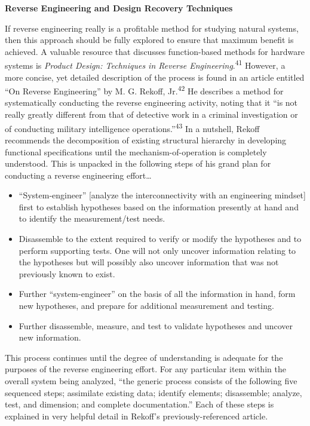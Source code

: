 \bigskip

\bfseries
Reverse Engineering and Design Recovery Techniques


If reverse engineering really is a profitable method for studying
natural systems, then this approach should be fully explored to ensure
that maximum benefit is achieved. A valuable resource that discusses
function-based methods for hardware systems is \textit{Product Design:
Techniques in Reverse Engineering}.\textsuperscript{41} However, a more
concise, yet detailed description of the process is found in an article
entitled “On Reverse Engineering” by M. G. Rekoff,
Jr.\textsuperscript{42} He describes a method for systematically
conducting the reverse engineering activity, noting that it “is not
really greatly different from that of detective work in a criminal
investigation or of conducting military intelligence
operations.”\textsuperscript{43} In a nutshell, Rekoff recommends the
decomposition of existing structural hierarchy in developing functional
specifications until the mechanism-of-operation is completely
understood. This is unpacked in the following steps of his grand plan
for conducting a reverse engineering effort…

\begin{itemize}
\item 
“System-engineer” [analyze the interconnectivity with an engineering
mindset] first to establish hypotheses based on the information
presently at hand and to identify the measurement/test needs.
\item 
Disassemble to the extent required to verify or modify the hypotheses
and to perform supporting tests. One will not only uncover information
relating to the hypotheses but will possibly also uncover information
that was not previously known to exist.
\item 
Further “system-engineer” on the basis of all the information in hand,
form new hypotheses, and prepare for additional measurement and
testing.
\item 
Further disassemble, measure, and test to validate hypotheses and
uncover new information.
\end{itemize}

This process continues until the degree of understanding is adequate for
the purposes of the reverse engineering effort. For any particular item
within the overall system being analyzed, “the generic process consists
of the following five sequenced steps; assimilate existing data;
identify elements; disassemble; analyze, test, and dimension; and
complete documentation.” Each of these steps is explained in very
helpful detail in Rekoff’s previously-referenced article.


